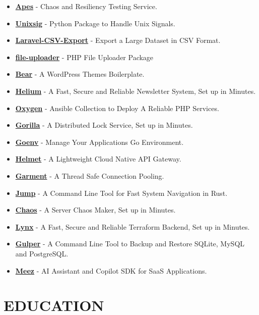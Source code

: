 \documentclass[paper=a4,fontsize=11pt]{scrartcl} %
\newcommand{\NewPart}[1]{\section*{\uppercase{#1}}}
\begin{document}
\begin{itemize}
\item \textbf{\href{https://github.com/Clivern/Apes}{Apes}} - Chaos and Resiliency Testing Service.
\item \textbf{\href{https://github.com/Clivern/Unixsig}{Unixsig}} - Python Package to Handle Unix Signals.
\item \textbf{\href{https://github.com/Clivern/Laravel-CSV-Export}{Laravel-CSV-Export}} - Export a Large Dataset in CSV Format.
\item \textbf{\href{https://github.com/Clivern/file_uploader}{file-uploader}} - PHP File Uploader Package
\item \textbf{\href{https://github.com/Clivern/Bear}{Bear}} - A WordPress Themes Boilerplate.
\item \textbf{\href{https://github.com/Clivernio/Helium}{Helium}} - A Fast, Secure and Reliable Newsletter System, Set up in Minutes.
\item \textbf{\href{https://github.com/Clivern/Oxygen}{Oxygen}} - Ansible Collection to Deploy A Reliable PHP Services.
\item \textbf{\href{https://github.com/Norwik/Gorilla}{Gorilla}} - A Distributed Lock Service, Set up in Minutes.
\item \textbf{\href{https://github.com/Clivern/Goenv}{Goenv}} - Manage Your Applications Go Environment.
\item \textbf{\href{https://github.com/Norwik/Helmet}{Helmet}} - A Lightweight Cloud Native API Gateway.
\item \textbf{\href{https://github.com/Norwik/Garment}{Garment}} - A Thread Safe Connection Pooling.
\item \textbf{\href{https://github.com/Clivern/Jump}{Jump}} - A Command Line Tool for Fast System Navigation in Rust.
\item \textbf{\href{https://github.com/Clivern/Chaos}{Chaos}} - A Server Chaos Maker, Set up in Minutes.
\item \textbf{\href{https://github.com/Clivern/Lynx}{Lynx}} - A Fast, Secure and Reliable Terraform Backend, Set up in Minutes.
\item \textbf{\href{https://github.com/Clivern/Gulper}{Gulper}} - A Command Line Tool to Backup and Restore SQLite, MySQL and PostgreSQL.
\item \textbf{\href{https://github.com/Clivern/Meez}{Meez}} - AI Assistant and Copilot SDK for SaaS Applications.
\end{itemize}


\NewPart{Education}{}
\end{document}
